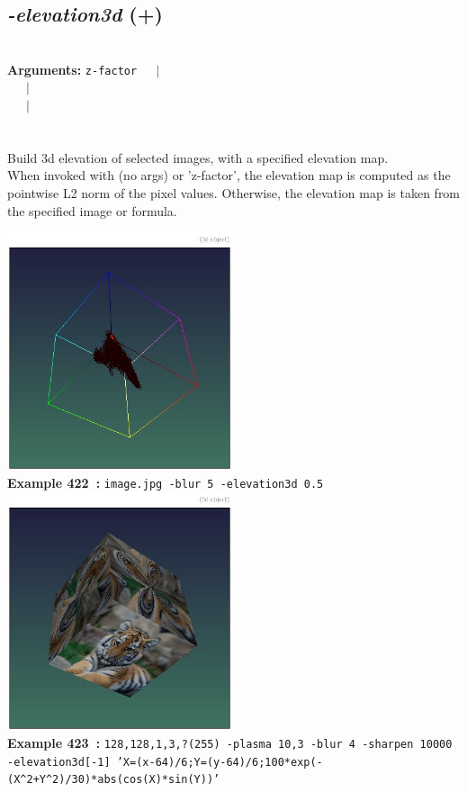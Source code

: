 \documentclass[a4paper,11pt,twoside]{book}
\begin{document}
\subsection{\emph{-elevation3d} (+)}\vspace*{-0.5em}
~\\\textbf{Arguments: } 
{\small \texttt{z-factor}}~~~$|$\\
~~~$|$\\
~~~$|$\\
\\~\\
Build 3d elevation of selected images, with a specified elevation map.
~\\When invoked with (no args) or 'z-factor', the elevation map is computed as the pointwise L2 norm of the
pixel values. Otherwise, the elevation map is taken from the specified image or formula.
\begin{center}\includegraphics[keepaspectratio=true,height=7cm,width=\textwidth]{img/gmic_def422.jpg}\\
{\footnotesize \textbf{Example 422~:} \texttt{image.jpg -blur 5 -elevation3d 0.5}}
\\\includegraphics[keepaspectratio=true,height=7cm,width=\textwidth]{img/gmic_def423.jpg}\\
{\footnotesize \textbf{Example 423~:} \texttt{128,128,1,3,?(255) -plasma 10,3 -blur 4 -sharpen 10000 -elevation3d[-1] 'X=(x-64)/6;Y=(y-64)/6;100*exp(-(X\textasciicircum 2+Y\textasciicircum 2)/30)*abs(cos(X)*sin(Y))'}}
\end{center}
\end{document}
